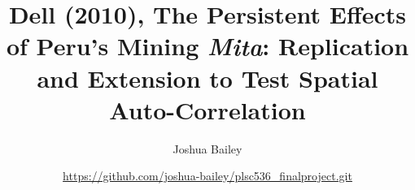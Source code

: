 \documentclass[a4paper,11pt]{article}
\title{Dell (2010), The Persistent Effects of Peru's Mining \emph{Mita}: Replication and Extension to Test Spatial Auto-Correlation}
\author{Joshua Bailey
\and \small \url{https://github.com/joshua-bailey/plsc536_finalproject.git}}
\begin{document}

 
\newpage 

\maketitle









\pagebreak

\nocite{*}
\printbibliography 

\pagebreak


\end{document}
